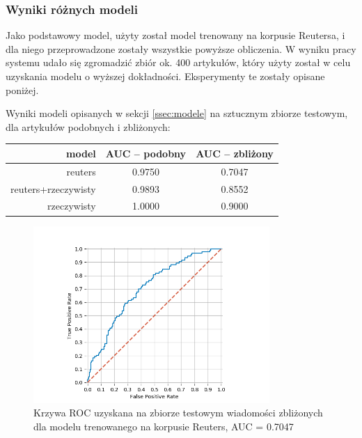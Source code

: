 \subsubsection*{Wyniki różnych modeli}
\label{sec:wyniki}

Jako podstawowy model, użyty został model trenowany na korpusie
Reutersa, i dla niego przeprowadzone zostały wszystkie powyższe
obliczenia. W wyniku pracy systemu udało się zgromadzić zbiór ok. 400
artykułów, który użyty został w celu uzyskania modelu o wyższej
dokładności. Eksperymenty te zostały opisane poniżej.


Wyniki modeli opisanych w sekcji \ref{ssec:modele} na sztucznym zbiorze
testowym, dla artykułów podobnych i zbliżonych:

\begin{center}
\begin{tabular}{r|c|c}
model & AUC -- podobny & AUC -- zbliżony\\
\hline
reuters & 0.9750 & 0.7047\\
reuters+rzeczywisty & 0.9893 & 0.8552\\
rzeczywisty & 1.0000 & 0.9000\\
\end{tabular}
\end{center}


\begin{figure}[H]
\centering
\includegraphics[width=0.8\textwidth]{./pict/reuters_z.png}
\caption{Krzywa ROC uzyskana na zbiorze testowym wiadomości zbliżonych  dla modelu trenowanego na korpusie Reuters, AUC = 0.7047}
\label{fig:rocidentical}
\end{figure}

